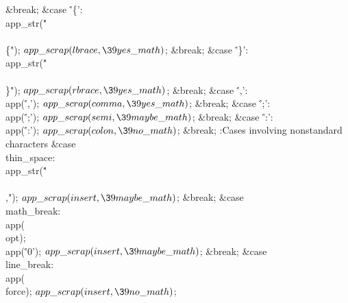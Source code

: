\&{break};\6
\4\&{case} \.{'\{'}:\5
\\{app\_str}(\.{"\\\\\{"});\5
${}\\{app\_scrap}(\\{lbrace},\39\\{yes\_math}){}$;\5
\&{break};\6
\4\&{case} \.{'\}'}:\5
\\{app\_str}(\.{"\\\\\}"});\5
${}\\{app\_scrap}(\\{rbrace},\39\\{yes\_math}){}$;\5
\&{break};\6
\4\&{case} \.{','}:\5
\\{app}(\.{','});\5
${}\\{app\_scrap}(\\{comma},\39\\{yes\_math}){}$;\5
\&{break};\6
\4\&{case} \.{';'}:\5
\\{app}(\.{';'});\5
${}\\{app\_scrap}(\\{semi},\39\\{maybe\_math}){}$;\5
\&{break};\6
\4\&{case} \.{':'}:\5
\\{app}(\.{':'});\5
${}\\{app\_scrap}(\\{colon},\39\\{no\_math}){}$;\5
\&{break};\6
\hbox{\4}:Cases involving nonstandard characters\X\6
\4\&{case} \\{thin\_space}:\5
\\{app\_str}(\.{"\\\\,"});\5
${}\\{app\_scrap}(\\{insert},\39\\{maybe\_math}){}$;\5
\&{break};\6
\4\&{case} \\{math\_break}:\5
\\{app}(\\{opt});\5
\\{app}(\.{'0'});\5
${}\\{app\_scrap}(\\{insert},\39\\{maybe\_math}){}$;\5
\&{break};\6
\4\&{case} \\{line\_break}:\5
\\{app}(\\{force});\5
${}\\{app\_scrap}(\\{insert},\39\\{no\_math}){}$;\5
